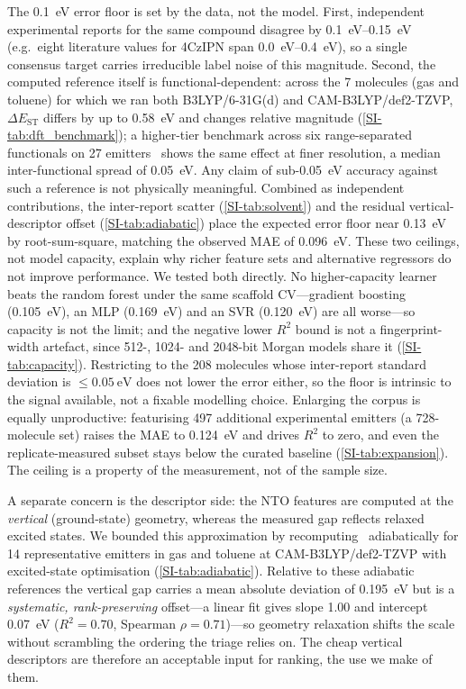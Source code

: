 The \qty{0.1}{\electronvolt} error floor is set by the data, not the model.
First, independent experimental reports for the same compound disagree by
\qtyrange{0.1}{0.15}{\electronvolt} (e.g.\ eight literature values for 4CzIPN span
\qtyrange{0.0}{0.4}{\electronvolt}), so a single consensus target carries
irreducible label noise of this magnitude.
Second, the computed reference itself is functional-dependent: across the
\num{7} molecules (gas and toluene) for which we ran both B3LYP/6-31G(d) and CAM-B3LYP/def2-TZVP,
$\Delta E_\text{ST}$ differs by up to \qty{0.58}{\electronvolt} and changes
relative magnitude (\cref{SI-tab:dft_benchmark}); a higher-tier benchmark across
six range-separated functionals on \num{27} emitters~\cite{Froitzheim2024} shows the same
effect at finer resolution, a median inter-functional spread of \qty{0.05}{\electronvolt}. Any claim of sub-\num{0.05}~eV
accuracy against such a reference is not physically meaningful. Combined as independent
contributions, the inter-report scatter (\cref{SI-tab:solvent}) and the residual
vertical-descriptor offset (\cref{SI-tab:adiabatic}) place the expected error floor near
\qty{0.13}{\electronvolt} by root-sum-square, matching the observed MAE of
\qty{0.096}{\electronvolt}. These two ceilings,
not model capacity, explain why richer feature sets and alternative regressors do
not improve performance. We tested both directly. No higher-capacity learner beats the
random forest under the same scaffold CV---gradient boosting (\qty{0.105}{\electronvolt}),
an MLP (\qty{0.169}{\electronvolt}) and an SVR (\qty{0.120}{\electronvolt}) are all
worse---so capacity is not the limit; and the negative lower $R^2$ bound is not a
fingerprint-width artefact, since \num{512}-, \num{1024}- and \num{2048}-bit Morgan models
share it (\cref{SI-tab:capacity}). Restricting to the \num{208} molecules whose
inter-report standard deviation is $\le\qty{0.05}{\electronvolt}$ does not lower the error
either, so the floor is intrinsic to the signal available, not a fixable modelling choice.
Enlarging the corpus is equally unproductive: featurising \num{497} additional experimental
emitters (a \num{728}-molecule set) raises the MAE to \qty{0.124}{\electronvolt} and drives
$R^2$ to zero, and even the replicate-measured subset stays below the curated baseline
(\cref{SI-tab:expansion}). The ceiling is a property of the measurement, not of the sample size.

A separate concern is the descriptor side: the NTO features are computed at the
\emph{vertical} (ground-state) geometry, whereas the measured gap reflects relaxed
excited states. We bounded this approximation by recomputing \deltaest\ adiabatically
for \num{14} representative emitters in gas and toluene at CAM-B3LYP/def2-TZVP with
excited-state optimisation (\cref{SI-tab:adiabatic}). Relative to these adiabatic
references the vertical gap carries a mean absolute deviation of
\qty{0.195}{\electronvolt} but is a \emph{systematic, rank-preserving} offset---a
linear fit gives slope \num{1.00} and intercept \qty{0.07}{\electronvolt}
($R^2 = 0.70$, Spearman $\rho = 0.71$)---so geometry relaxation shifts the scale
without scrambling the ordering the triage relies on. The cheap vertical descriptors
are therefore an acceptable input for ranking, the use we make of them.

